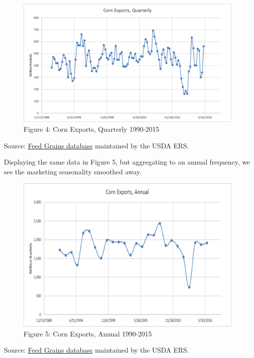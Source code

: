 \documentclass[]{book}
\theoremstyle{definition}
\theoremstyle{definition}
\theoremstyle{remark}
\begin{document}
\begin{figure}[htbp]
\centering
\includegraphics{Excel-files/IntroductiontoCommodityTS-FeedGrains_Corn_files/image014.png}
\caption{Figure 4: Corn Exports, Quarterly 1990-2015}
\end{figure}

Source:
\href{http://www.ers.usda.gov/data-products/feed-grains-database/feed-grains-yearbook-tables.aspx\#26780}{Feed
Grains database} maintained by the USDA ERS.

Displaying the same data in Figure 5, but aggregating to an annual
frequency, we see the marketing seasonality smoothed away.

\begin{figure}[htbp]
\centering
\includegraphics{Excel-files/IntroductiontoCommodityTS-FeedGrains_Corn_files/image023.png}
\caption{Figure 5: Corn Exports, Annual 1990-2015}
\end{figure}

Source:
\href{http://www.ers.usda.gov/data-products/feed-grains-database/feed-grains-yearbook-tables.aspx\#26780}{Feed
Grains database} maintained by the USDA ERS.
\end{document}
